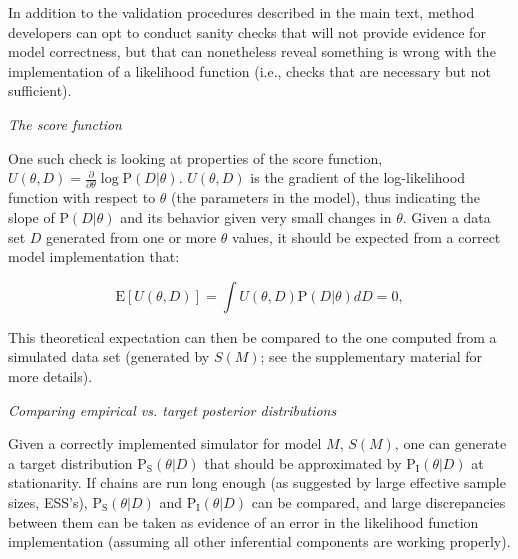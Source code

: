 \documentclass[oneside]{article}
\begin{document}
\vspace{.25cm}
\begin{tcolorbox}[breakable, width=\textwidth, colback=gray!10, boxrule=0pt,
  title=Box 2: Additional validation sanity-checks, fonttitle=\bfseries]
  \small

  In addition to the validation procedures described in the main text,
  method developers can opt to conduct sanity checks that will not
  provide evidence for model correctness, but that can nonetheless
  reveal something is wrong with the implementation of a likelihood
  function (i.e., checks that are necessary but not sufficient).
  
  \vspace{.25cm}
  \emph{The score function}
  
  One such check is looking at properties of the score function,
  $U(\theta,D)=\frac{\partial}{\partial\theta}\log
  \text{P}(D|\theta)$.
  $U(\theta,D)$ is the gradient of the log-likelihood function with
  respect to $\theta$ (the parameters in the model), thus indicating
  the slope of $\text{P}(D|\theta)$ and its behavior given very small
  changes in $\theta$.
  Given a data set $D$ generated from one or more $\theta$ values, it
  should be expected from a correct model implementation that:

  \begin{equation}\label{eq:scorefunction}
    \text{E}[U(\theta,D)] = \int U(\theta,D)\text{P}(D|\theta)dD = 0,
  \end{equation}


  This theoretical expectation can then be compared to the one
  computed from a simulated data set (generated by $S(M)$; see the
  supplementary material for more details).

  \vspace{.25cm}
  \emph{Comparing empirical vs. target posterior distributions}

  Given a correctly implemented simulator for model $M$, $S(M)$, one
  can generate a target distribution $\text{P}_{\text{S}}(\theta|D)$
  that should be approximated by $\text{P}_{\text{I}}(\theta|D)$ at stationarity.
  If chains are run long enough (as suggested by large effective
  sample sizes, ESS's), $\text{P}_{\text{S}}(\theta|D)$ and
  $\text{P}_{\text{I}}(\theta|D)$ can be compared, and large
  discrepancies between them can be taken as evidence of an error in the
  likelihood function implementation (assuming all other inferential
  components are working properly).


\end{tcolorbox}
\end{document}
